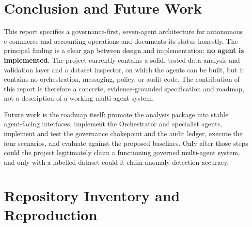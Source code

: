 \documentclass[11pt,a4paper]{article}
\begin{document}
\section{Conclusion and Future Work}
This report specifies a governance-first, seven-agent architecture for autonomous e-commerce and accounting operations and documents its status honestly. The principal finding is a clear gap between design and implementation: \textbf{no agent is implemented}. The project currently contains a solid, tested data-analysis and validation layer and a dataset inspector, on which the agents can be built, but it contains no orchestration, messaging, policy, or audit code. The contribution of this report is therefore a concrete, evidence-grounded specification and roadmap, not a description of a working multi-agent system.

Future work is the roadmap itself: promote the analysis package into stable agent-facing interfaces, implement the Orchestrator and specialist agents, implement and test the governance chokepoint and the audit ledger, execute the four scenarios, and evaluate against the proposed baselines. Only after those steps could the project legitimately claim a functioning governed multi-agent system, and only with a labelled dataset could it claim anomaly-detection accuracy.




\appendix
\section{Repository Inventory and Reproduction}
\label{app:inventory}
\end{document}
